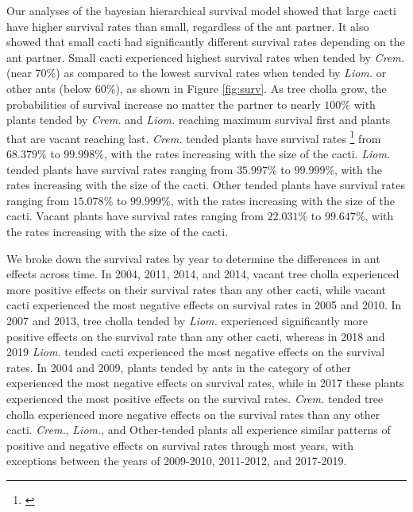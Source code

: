 \documentclass[12pt,a4paper]{article}
\newcommand{\tom}[2]{{\color{red}{#1}}\footnote{\textit{\color{red}{#2}}}}
\begin{document}
		Our analyses of the bayesian hierarchical survival model showed that large cacti have higher survival rates than small, regardless of the ant partner. 
		It also showed that small cacti had significantly different survival rates depending on the ant partner. 
		Small cacti experienced highest survival rates when tended by \textit{Crem.} (near $70\%$) as compared to the lowest survival rates when tended by \textit{Liom.} or other ants (below $60\%$), as shown in Figure \ref{fig:surv}.
		As tree cholla grow, the probabilities of survival increase no matter the partner to nearly $100\%$ with plants tended by \textit{Crem.} and \textit{Liom.} reaching maximum survival first and plants that are vacant reaching last. 
		\textit{Crem.} tended plants have survival rates \tom{ranging}{These ranges are not meaningful because survival is so dependent on size.} from $68.379\%$ to $99.998\%$, with the rates increasing with the size of the cacti.  
		\textit{Liom.} tended plants have survival rates ranging from $35.997\%$ to $99.999\%$, with the rates increasing with the size of the cacti. 
		Other tended plants have survival rates ranging from $15.078\%$ to $99.999\%$, with the rates increasing with the size of the cacti. 
		Vacant plants have survival rates ranging from $22.031\%$ to $99.647\%$, with the rates increasing with the size of the cacti. 
		
		We broke down the survival rates by year to determine the differences in ant effects across time. 
		In 2004, 2011, 2014, and 2014, vacant tree cholla experienced more positive effects on their survival rates than any other cacti, while vacant cacti experienced the most negative effects on survival rates in 2005 and 2010.
		In 2007 and 2013, tree cholla tended by \textit{Liom.} experienced significantly more positive effects on the survival rate than any other cacti, whereas in 2018 and 2019 \textit{Liom.} tended cacti experienced the most negative effects on the survival rates. 
		In 2004 and 2009, plants tended by ants in the category of other experienced the most negative effects on survival rates, while in 2017 these plants experienced the most positive effects on the survival rates. 
		\textit{Crem.} tended tree cholla experienced more negative effects on the survival rates than any other cacti. 
		\textit{Crem.}, \textit{Liom.}, and Other-tended plants all experience similar patterns of positive and negative effects on survival rates through most years, with exceptions between the years of 2009-2010, 2011-2012, and 2017-2019. 
		
\end{document}
